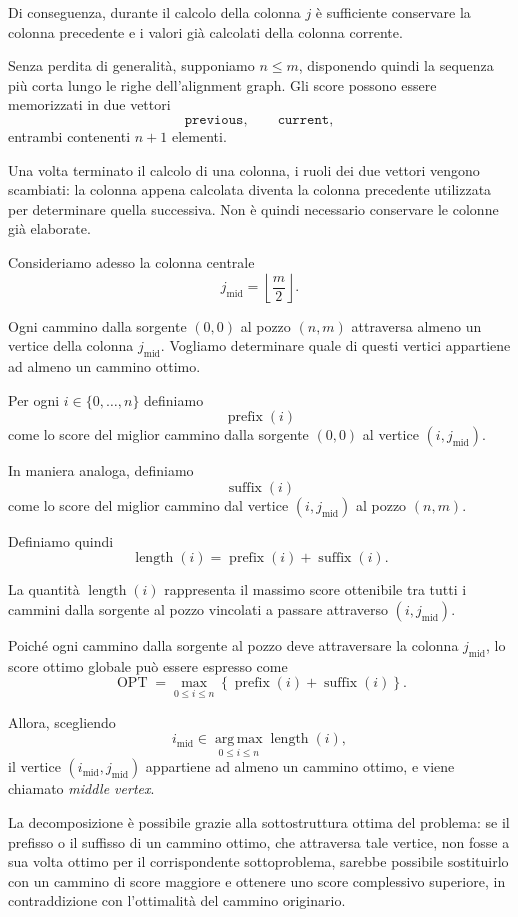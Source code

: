 Di conseguenza, durante il calcolo della colonna $j$ è sufficiente conservare la colonna precedente e i valori già calcolati della
colonna corrente.

Senza perdita di generalità, supponiamo $n \leq m$, disponendo quindi la sequenza più corta lungo le righe dell'alignment graph.
Gli score possono essere memorizzati in due vettori
\[
    \texttt{previous}, \qquad \texttt{current},
\]
entrambi contenenti $n+1$ elementi.

Una volta terminato il calcolo di una colonna, i ruoli dei due vettori vengono scambiati: la colonna appena calcolata diventa la 
colonna precedente utilizzata per determinare quella successiva.
Non è quindi necessario conservare le colonne già elaborate.

Consideriamo adesso la colonna centrale
\[
    j_{\mathrm{mid}}=\left\lfloor \frac{m}{2}\right\rfloor.
\]

Ogni cammino dalla sorgente $(0,0)$ al pozzo $(n,m)$ attraversa almeno un vertice della colonna $j_{\mathrm{mid}}$.
Vogliamo determinare quale di questi vertici appartiene ad almeno un cammino ottimo.

Per ogni $i \in \{ 0,\ldots,n \}$ definiamo
\[
    \operatorname{prefix}(i)
\]
come lo score del miglior cammino dalla sorgente $(0,0)$ al vertice $(i,j_{\mathrm{mid}})$.

In maniera analoga, definiamo
\[
    \operatorname{suffix}(i)
\]
come lo score del miglior cammino dal vertice $(i,j_{\mathrm{mid}})$ al pozzo $(n,m)$.

Definiamo quindi
\[
    \operatorname{length}(i) = \operatorname{prefix}(i) + \operatorname{suffix}(i).
\]

La quantità $\operatorname{length}(i)$ rappresenta il massimo score ottenibile tra tutti i cammini dalla sorgente al pozzo vincolati
a passare attraverso $(i,j_{\mathrm{mid}})$.

Poiché ogni cammino dalla sorgente al pozzo deve attraversare la colonna $j_{\mathrm{mid}}$, lo score ottimo globale può essere espresso come
\[
    \operatorname{OPT} = \max_{0 \leq i \leq n}\left\{ \operatorname{prefix}(i) + \operatorname{suffix}(i)\right\}.
\]

Allora, scegliendo
\[
    i_{\mathrm{mid}} \in \operatorname*{arg\,max}_{0 \leq i \leq n} \operatorname{length}(i),
\]
il vertice $(i_{\mathrm{mid}},j_{\mathrm{mid}})$ appartiene ad almeno un cammino ottimo, e viene chiamato \emph{middle vertex}.

La decomposizione è possibile grazie alla sottostruttura ottima del problema:
se il prefisso o il suffisso di un cammino ottimo, che attraversa tale vertice, non fosse a sua volta ottimo per il corrispondente sottoproblema,
sarebbe possibile sostituirlo con un cammino di score maggiore e ottenere uno score complessivo superiore, in contraddizione con l'ottimalità
del cammino originario.


